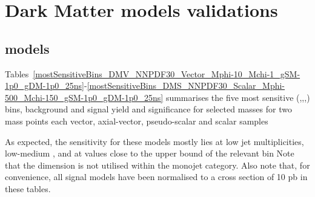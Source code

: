 \section{Dark Matter models validations}
\label{sec:dm_checklist}

\subsection{\DMj models}

Tables~\ref{mostSensitiveBins_DMV_NNPDF30_Vector_Mphi-10_Mchi-1_gSM-1p0_gDM-1p0_25ns}-\ref{mostSensitiveBins_DMS_NNPDF30_Scalar_Mphi-500_Mchi-150_gSM-1p0_gDM-1p0_25ns} summarises the five most sensitive (\njet,\nb,\scalht,\mht) bins, background and signal yield and significance for selected \DMbb masses for two mass points each vector, axial-vector, pseudo-scalar and scalar samples

As expected, the sensitivity for these models mostly lies at low jet
multiplicities, low-medium \scalht, and at \mht values close to the upper bound
of the relevant \scalht bin Note that the \mht dimension is not utilised within 
the monojet category. Also note that, for convenience, all signal models have 
been normalised to a cross section of 10 pb in these tables.




\\
\\

\\
\\

\\
\\

\\
\\



